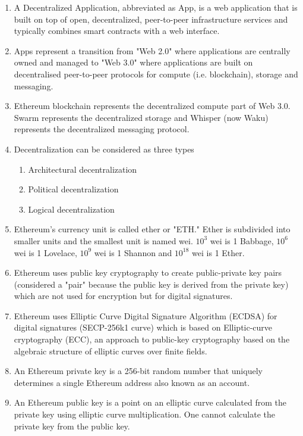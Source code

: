 \begin{enumerate}
\item A Decentralized Application, abbreviated as \DJ App, is a web application that is built on top of open, decentralized, peer-to-peer infrastructure services and typically combines smart contracts with a web interface.

\item \DJ Apps represent a transition from "Web 2.0" where applications are centrally owned and managed to "Web 3.0" where applications are built on decentralised peer-to-peer protocols for compute (i.e. blockchain), storage and messaging.

\item Ethereum blockchain represents the decentralized compute part of Web 3.0. Swarm represents the decentralized storage and Whisper (now Waku) represents the decentralized messaging protocol.

\item Decentralization can be considered as three types
\begin{enumerate}
\item Architectural decentralization
\item Political decentralization
\item Logical decentralization
\end{enumerate}

\item Ethereum's currency unit is called ether or "ETH." Ether is subdivided into smaller units and the smallest unit is named wei. $10^3$ wei is 1 Babbage, $10^6$ wei is 1 Lovelace, $10^9$ wei is 1 Shannon and $10^{18}$ wei is 1 Ether.

\item Ethereum uses public key cryptography to create public-private key pairs (considered a "pair" because the public key is derived from the private key) which are not used for encryption but for digital signatures.

\item Ethereum uses Elliptic Curve Digital Signature Algorithm (ECDSA) for digital signatures (SECP-256k1 curve) which is based on Elliptic-curve cryptography (ECC), an approach to public-key cryptography based on the algebraic structure of elliptic curves over finite fields.

\item An Ethereum private key is a 256-bit random number that uniquely determines a single Ethereum address also known as an account.

\item An Ethereum public key is a point on an elliptic curve calculated from the private key using elliptic curve multiplication. One cannot calculate the private key from the public key.


\end{enumerate}
